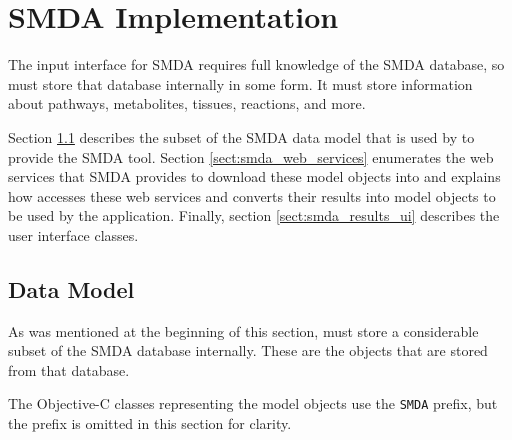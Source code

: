 \section{SMDA Implementation}
\label{sect:smda_implementation}

The input interface for SMDA requires full knowledge of the SMDA database, so
\mawapp must store that database internally in some form. It must store
information about pathways, metabolites, tissues, reactions, and more.

Section \ref{sect:smda_data_model} describes the subset of the SMDA data model
that is used by \mawapp to provide the SMDA tool. Section
\ref{sect:smda_web_services} enumerates the web services that SMDA provides to
download these model objects into \mawapp and explains how \mawapp accesses
these web services and converts their results into model objects to be used by
the application. Finally, section \ref{sect:smda_results_ui} describes the user
interface classes.

\subsection{Data Model}
\label{sect:smda_data_model}

As was mentioned at the beginning of this section, \mawapp must store a
considerable subset of the SMDA database internally. These are the objects that
are stored from that database.

The Objective-C classes representing the model objects use the \texttt{SMDA}
prefix, but the prefix is omitted in this section for clarity.


